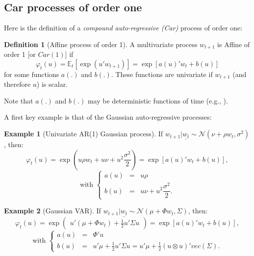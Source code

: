 \documentclass[
  12pt,
]{book}
\theoremstyle{definition}
\newtheorem{definition}{Definition}[chapter]
\theoremstyle{definition}
\newtheorem{example}{Example}[chapter]
\theoremstyle{definition}
\theoremstyle{definition}
\theoremstyle{remark}
\begin{document}
\hypertarget{car-processes-of-order-one}{%
\subsection{Car processes of order one}\label{car-processes-of-order-one}}

Here is the definition of a \emph{compound auto-regressive (Car)} process of order one:

\begin{definition}[Affine process of order 1]
\protect\hypertarget{def:Car1}{}\label{def:Car1}A multivariate process \(w_{t+1}\) is Affine of order 1 {[}or \(Car(1)\){]} if
\[
\varphi_t(u)=\mathbb{E}_t[\exp(u'w_{t+1})]=\exp[a(u)'w_t+b(u)]
\]
for some functions \(a(.)\) and \(b(.)\). These functions are univariate if \(w_{t+1}\) (and therefore \(u\)) is scalar.
\end{definition}

Note that \(a(.)\) and \(b(.)\) may be deterministic functions of time (e.g., \citet{Chikhani_Renne_2022}).

A first key example is that of the Gaussian auto-regressive processes:

\begin{example}[Univariate AR(1) Gaussian process]
\protect\hypertarget{exm:GAR1}{}\label{exm:GAR1}If \(w_{t+1}|\underline{w_t} \sim \mathcal{N}(\nu+\rho w_t, \sigma^2)\), then:
\[
\varphi_t(u) = \exp\left(
u \rho w_t + u \nu + u^2  \frac{\sigma^2}{2}
\right) = \exp[a(u)'w_t+b(u)],
\]
\[
\mbox{with }\left\{
\begin{array}{cll}
a(u) &=& u \rho\\
b(u) &=& u \nu + u^2  \dfrac{\sigma^2}{2}.
\end{array}
\right.
\]
\end{example}

\begin{example}[Gaussian VAR]
\protect\hypertarget{exm:GVAR1}{}\label{exm:GVAR1}If \(w_{t+1}|\underline{w_t} \sim \mathcal{N}(\mu+\Phi w_t, \Sigma)\), then:
\[
\varphi_t(u) = \exp\left(
\begin{array}{l}
u' (\mu + \Phi  w_t)  +  \frac{1}{2} u' \Sigma u
\end{array}
\right) = \exp[a(u)'w_t+b(u)],
\]
\[
\mbox{with }\left\{
\begin{array}{ccl}
a(u) &=& \Phi'u\\
b(u) &=& u' \mu +  \frac{1}{2} u' \Sigma u = u' \mu + \frac{1}{2}(u \otimes u)' vec(\Sigma).
\end{array}
\right.
\]
\end{example}
\end{document}
